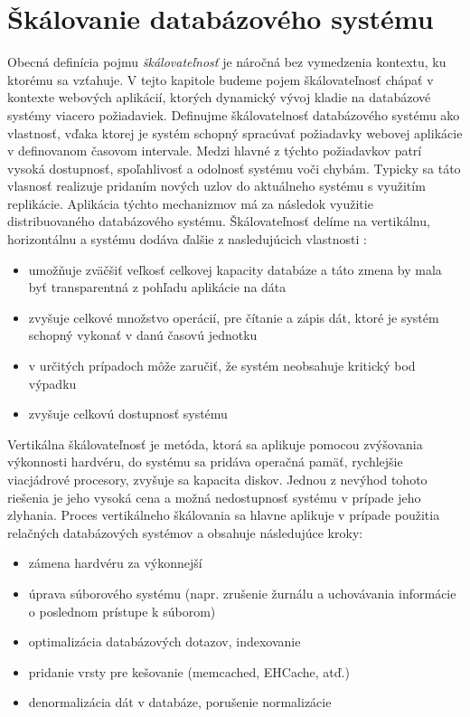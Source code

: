 \documentclass[11pt,twoside,a4paper]{book}
\begin{document}

\section{Škálovanie databázového systému} %
Obecná definícia pojmu \emph{škálovateľnosť} \cite{bondi2000characteristics} je náročná  bez vymedzenia kontextu, ku ktorému sa vzťahuje. V tejto kapitole budeme pojem škálovateľnosť chápať v kontexte webových aplikácií, ktorých dynamický vývoj kladie na databázové systémy viacero požiadaviek. Definujme škálovatelnosť databázového systému ako vlastnosť, vďaka ktorej je systém schopný spracúvať požiadavky webovej aplikácie v definovanom časovom intervale. Medzi hlavné z týchto požiadavkov patrí vysoká dostupnosť, spoľahlivosť a odolnosť systému voči chybám. Typicky sa táto vlasnosť realizuje pridaním nových uzlov do aktuálneho systému s využitím replikácie. Aplikácia týchto mechanizmov má za následok využitie distribuovaného databázového systému. Škálovateľnosť delíme na vertikálnu, horizontálnu a systému dodáva ďalšie z nasledujúcich vlastnosti \cite{hewitt2010cassandra}:
\begin{itemize}
 \item umožňuje zväčšiť veľkosť celkovej kapacity databáze a táto zmena by mala byť transparentná z pohľadu aplikácie na dáta
  \item zvyšuje celkové množstvo operácií, pre čítanie a zápis dát, ktoré je systém schopný vykonať v danú časovú jednotku
  \item v určitých prípadoch môže zaručiť, že systém neobsahuje kritický bod výpadku
  \item zvyšuje celkovú dostupnosť systému
\end{itemize}

Vertikálna škálovateľnosť je metóda, ktorá sa aplikuje pomocou zvýšovania výkonnosti hardvéru, do systému sa pridáva operačná pamäť, rychlejšie viacjádrové procesory, zvyšuje sa kapacita diskov. Jednou z nevýhod tohoto riešenia je jeho vysoká cena a možná nedostupnosť systému v prípade jeho zlyhania.
Proces vertikálneho škálovania sa hlavne aplikuje v prípade použitia relačných databázových systémov  a obsahuje následujúce kroky:
\begin{itemize}
 \item zámena hardvéru za výkonnejší
 \item úprava súborového systému (napr. zrušenie žurnálu a uchovávania informácie o poslednom prístupe k súborom)
 \item optimalizácia databázových dotazov, indexovanie
 \item pridanie vrsty pre kešovanie (memcached, EHCache, atď.)
 \item denormalizácia dát v databáze, porušenie normalizácie
\end{itemize}
\end{document}
